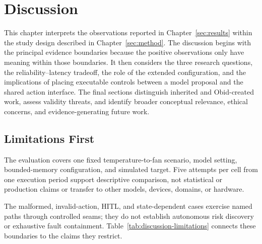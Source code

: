 \section{Discussion}\label{sec:discussion}
\setlength{\emergencystretch}{4em}

This chapter interprets the observations reported in Chapter~\ref{sec:results}
within the study design described in Chapter~\ref{sec:method}. The discussion
begins with the principal evidence boundaries because the positive observations
only have meaning within those boundaries. It then considers the three research
questions, the reliability--latency tradeoff, the role of the extended
configuration, and the implications of placing executable controls between a
model proposal and the shared action interface. The final sections distinguish
inherited and Obid-created work, assess validity threats, and identify broader
conceptual relevance, ethical concerns, and evidence-generating future work.

\subsection{Limitations First}\label{subsec:discussion-limitations-first}

The evaluation covers one fixed temperature-to-fan scenario, model setting,
bounded-memory configuration, and simulated target. Five attempts per cell from
one execution period support descriptive comparison, not statistical or
production claims or transfer to other models, devices, domains, or hardware.

The malformed, invalid-action, HITL, and state-dependent cases exercise named
paths through controlled seams; they do not establish autonomous risk discovery
or exhaustive fault containment. Table~\ref{tab:discussion-limitations}
connects these boundaries to the claims they restrict.

